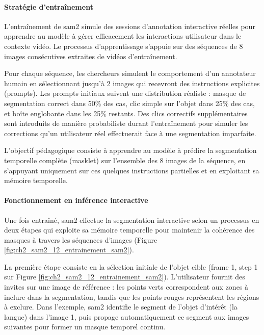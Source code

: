\paragraph{Stratégie d'entraînement}

L'entraînement de \acrshort{sam2} simule des sessions d'annotation interactive réelles pour apprendre au modèle à gérer efficacement les interactions utilisateur dans le contexte vidéo. Le processus d'apprentissage s'appuie sur des séquences de 8 images consécutives extraites de vidéos d'entraînement.

Pour chaque séquence, les chercheurs simulent le comportement d'un annotateur humain en sélectionnant jusqu'à 2 images qui recevront des instructions explicites (prompts). Les prompts initiaux suivent une distribution réaliste : masque de segmentation correct dans 50\% des cas, clic simple sur l'objet dans 25\% des cas, et boîte englobante dans les 25\% restants. Des clics correctifs supplémentaires sont introduits de manière probabiliste durant l'entraînement pour simuler les corrections qu'un utilisateur réel effectuerait face à une segmentation imparfaite.

L'objectif pédagogique consiste à apprendre au modèle à prédire la segmentation temporelle complète (masklet) sur l'ensemble des 8 images de la séquence, en s'appuyant uniquement sur ces quelques instructions partielles et en exploitant sa mémoire temporelle.

\paragraph{Fonctionnement en inférence interactive}

Une fois entraîné, \acrshort{sam2} effectue la segmentation interactive selon un processus en deux étapes qui exploite sa mémoire temporelle pour maintenir la cohérence des masques à travers les séquences d'images (Figure \ref{fig:ch2_sam2_12_entrainement_sam2}).

La première étape consiste en la sélection initiale de l'objet cible (frame 1, step 1 sur Figure \ref{fig:ch2_sam2_12_entrainement_sam2}). L'utilisateur fournit des invites sur une image de référence : les points verts correspondent aux zones à inclure dans la segmentation, tandis que les points rouges représentent les régions à exclure. Dans l'exemple, \acrshort{sam2} identifie le segment de l'objet d'intérêt (la langue) dans l'image 1, puis propage automatiquement ce segment aux images suivantes pour former un masque temporel continu.

